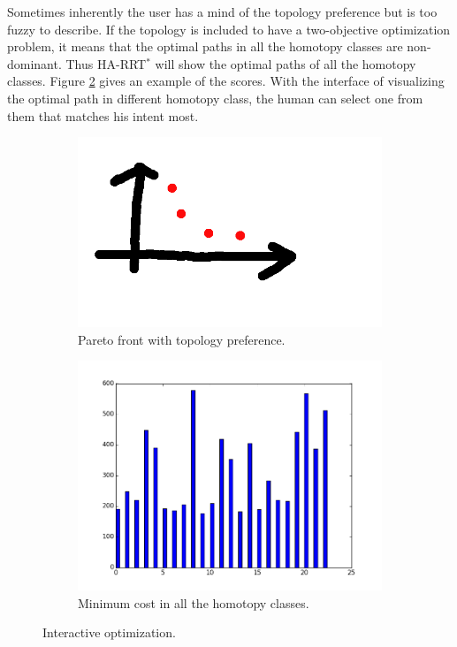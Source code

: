 \documentclass[letterpaper, 10 pt, conference]{ieeeconf}
\begin{document}
Sometimes inherently the user has a mind of the topology preference but is too fuzzy to describe.
If the topology is included to have a two-objective optimization problem, it means that the optimal paths in all the homotopy classes are non-dominant.
Thus HA-RRT$^{*}$ will show the optimal paths of all the homotopy classes.
Figure \ref{fig:homotopy_human_interaction:all_scores} gives an example of the scores.
With the interface of visualizing the optimal path in different homotopy class, the human can select one from them that matches his intent most.

\begin{figure}
	\centering
	\begin{subfigure}[t]{0.47\linewidth}
		\centering
		\includegraphics[width=\textwidth]{fig/pareto.png}
		\caption{Pareto front with topology preference.}
		\label{fig:homotopy_human_interaction:pareto_score}
	\end{subfigure}  
	\begin{subfigure}[t]{0.47\linewidth}
		\centering
		\includegraphics[width=\textwidth]{fig/all_homotopy_score.png}
		\caption{Minimum cost in all the homotopy classes.}
		\label{fig:homotopy_human_interaction:all_scores}
	\end{subfigure}   
	\caption{Interactive optimization.}
	\label{fig:homotopy_human_interaction}
\end{figure}
\end{document}
